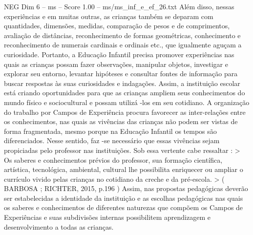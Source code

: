 \begin{textsample}{NEG Dim 6 – ms – Score 1.00 – ms/ms\_inf\_e\_ef\_26.txt}
Além disso, nessas experiências e em muitas outras, as crianças também se deparam com quantidades, dimensões, medidas, comparação de pesos e de comprimentos, avaliação de distâncias, reconhecimento de formas geométricas, conhecimento e reconhecimento de numerais cardinais e ordinais etc., que igualmente aguçam a curiosidade.
Portanto, a Educação Infantil precisa promover experiências nas quais as crianças possam fazer observações, manipular objetos, investigar e explorar seu entorno, levantar hipóteses e consultar fontes de informação para buscar respostas às suas curiosidades e indagações.
Assim, a instituição escolar está criando oportunidades para que as crianças ampliem seus conhecimentos do mundo físico e sociocultural e possam utilizá -los em seu cotidiano.
A organização do trabalho por Campos de Experiência procura favorecer as inter-relações entre os conhecimentos, nas quais as vivências das crianças não podem ser vistas de forma fragmentada, mesmo porque na Educação Infantil os tempos são diferenciados.
Nesse sentido, faz -se necessário que essas vivências sejam propiciadas pelo professor nas instituições.
Sob essa vertente cabe ressaltar : > Os saberes e conhecimentos prévios do professor, sua formação científica, artística, tecnológica, ambiental, cultural lhe possibilita enriquecer ou ampliar o currículo vivido pelas crianças no cotidiano da creche e da pré-escola. > ( BARBOSA ; RICHTER, 2015, p.196 ) Assim, nas propostas pedagógicas deverão ser estabelecidas a identidade da instituição e as escolhas pedagógicas nas quais os saberes e conhecimentos de diferentes naturezas que compõem os Campos de Experiências e suas subdivisões internas possibilitem aprendizagem e desenvolvimento a todas as crianças.

\end{textsample}

